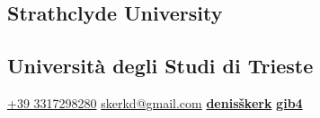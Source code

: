 \documentclass[draft]{dske-resume-openfont}
\begin{document}
%
%
\lastupdated{}

%
%

%
%

\begin{minipage}[t]{0.31\textwidth} 


{\fontsize{\the\smallerfont}{\the\smallerlinespace}\selectfont
\subsection{Strathclyde University}
\vspace{\smallgap}

\subsection{Universit\`{a} degli Studi di Trieste}
}


{\fontsize{\the\smallerfont}{\the\smallerlinespace}\selectfont
\faPhone\hspace{\iconspacesmall} \href{tel:+393317298280}{+39 3317298280}
\faEnvelope\hspace{\iconspacesmall} \href{mailto:skerkd@gmail.com}{skerkd@gmail.com}
\faLinkedin\hspace{\iconspacesmall} \href{https://www.linkedin.com/in/denis-\%C5\%A1kerk/}{\bf denisškerk}
\faGithub\hspace{\iconspacesmall} \href{https://github.com/gib4}{\bf gib4}}

\vspace{\sectionpadding}



\end{minipage}
\end{document}
